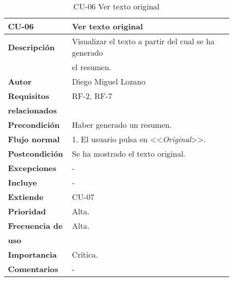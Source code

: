 \begin{longtable}{>{\raggedright}b{0.2\linewidth}>{\raggedright\arraybackslash}b{0.7\linewidth}}
	\toprule
	\textbf{CU-06} & \textbf{Ver texto original} \\
	\toprule
	\endhead
	
	\toprule
	\caption{CU-06 Ver texto original}
	\endfoot
	
	\small{\textbf{Descripción}} & Visualizar el texto a partir del cual se ha generado \\
	& el resumen. \\
	\small{\textbf{Autor}} & Diego Miguel Lozano \\
	\small{\textbf{Requisitos}} & RF-2, RF-7  \\
	\small{\textbf{relacionados}} & \\
	\small{\textbf{Precondición}} & Haber generado un resumen. \\
	\small{\textbf{Flujo normal}} & \quad \small{1. El usuario pulsa en <<\emph{Original}>>. } \\
	\small{\textbf{Postcondición}} & Se ha mostrado el texto original.\\
	\small{\textbf{Excepciones}} & - \\
	\small{\textbf{Incluye}} & - \\
	\small{\textbf{Extiende}} & CU-07 \\
	\small{\textbf{Prioridad}} & Alta. \\
	\small{\textbf{Frecuencia de}} & Alta. \\
	\small{\textbf{uso}} & \\
	\small{\textbf{Importancia}} & Crítica. \\
	\small{\textbf{Comentarios}} & - \\
\end{longtable}


